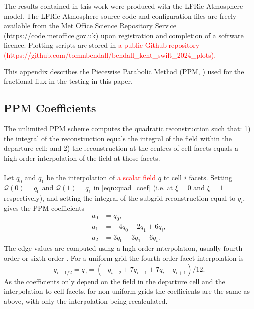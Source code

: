 \documentclass{ametsocV6.1}
\newcommand{\change}[1]{\textcolor{red}{#1}}
\begin{document}
The results contained in this work were produced with the LFRic-Atmosphere model.
The LFRic-Atmosphere source code and configuration files are freely available from the Met Office Science Repository Service
(https://code.metoffice.gov.uk) upon registration and completion of a software licence.
Plotting scripts are stored in \change{a  public Github repository (https://github.com/tommbendall/bendall\_kent\_swift\_2024\_plots).}


\appendix[A] \label{sec:ppm_appendix}


This appendix describes the Piecewise Parabolic Method (PPM, \citet{colella1984ppm}) used for the fractional flux in the testing in this paper.

\subsection{PPM Coefficients} \label{sec:ppm_recon}

The unlimited PPM scheme \citep{colella1984ppm} computes the quadratic reconstruction such that: 1) the integral of the reconstruction equals the integral of the field within the departure cell; and 2) the reconstruction at the centres of cell facets equals a high-order interpolation of the field at those facets. \\
\\
Let $q_0$ and $q_1$ be the interpolation of \change{a scalar field} $q$ to cell $i$ facets. Setting $\mathcal{Q}(0)=q_0$ and $\mathcal{Q}(1) = q_1$ in \eqref{eqn:quad_coef} (i.e. at $\xi=0$ and $\xi=1$ respectively), and setting the integral of the subgrid reconstruction equal to $q_i$, gives the PPM coefficients
\begin{subequations}
\begin{align}
    a_0 &= q_0, \\
    a_1 &= -4 q_0 - 2 q_1 + 6 q_i, \\
    a_2 &= 3 q_0 + 3 q_1 - 6 q_i.
\end{align}
\end{subequations}
The edge values are computed using a high-order interpolation, usually fourth-order \citep{colella1984ppm} or sixth-order \citep{colella2008}.
For a uniform grid the fourth-order facet interpolation is
\begin{equation}
    q_{i-1/2} = q_0 = \left( -q_{i-2} + 7 q_{i-1} + 7 q_{i} - q_{i+1}\right)/12.
\end{equation}
As the coefficients only depend on the field in the departure cell and the interpolation to cell facets, for non-uniform grids the coefficients are the same as above, with only the interpolation being recalculated.  
\end{document}
